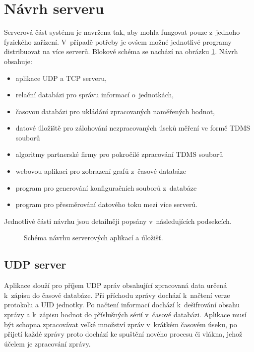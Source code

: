 \section{Návrh serveru}
Serverová část systému je navržena tak, aby mohla fungovat pouze z~jednoho fyzického zařízení. V~případě potřeby je ovšem možné jednotlivé programy distribuovat na více serverů. Blokové schéma se nachází na obrázku \ref{pic:server_design}. Návrh obsahuje:
\begin{itemize}
    \item aplikace UDP a TCP serveru,
    \item relační databázi pro správu informací o~jednotkách,
    \item časovou databázi pro ukládání zpracovaných naměřených hodnot,
    \item datové úložiště pro zálohování nezpracovaných úseků měření ve formě TDMS souborů
    \item algoritmy partnerské firmy pro pokročilé zpracování TDMS souborů
    \item webovou aplikaci pro zobrazení grafů z~časové databáze
    \item program pro generování konfiguračních souborů z~databáze
    \item program pro přesměrování datového toku mezi více serverů.
\end{itemize}
Jednotlivé části návrhu jsou detailněji popsány v~následujících podsekcích. 

\begin{figure}[h]
  \centering
  \caption{Schéma návrhu serverových aplikací a úložišť.}\label{pic:server_design}
\end{figure}

\subsection{UDP server}
Aplikace slouží pro příjem UDP zpráv obsahující zpracovaná data určená k~zápisu do časové databáze. Při příchodu zprávy dochází k~načtení verze protokolu a UID jednotky. Po načtení informací dochází k~dešifrování obsahu zprávy a k~zápisu hodnot do příslušných sérií v~časové databázi. Aplikace musí být schopna zpracovávat velké množství zpráv v~krátkém časovém úseku, po přijetí každé zprávy proto dochází ke spuštění nového procesu či vlákna, jehož účelem je zpracování zprávy.

